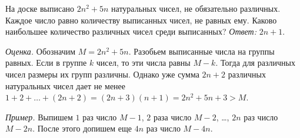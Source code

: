 \problem
На доске выписано $2 n^2 + 5 n$ натуральных чисел, не обязательно различных.
Каждое число равно количеству выписанных чисел, не равных ему.
Каково наибольшее количество различных чисел среди выписанных?
\solution
\emph{Ответ:} $2 n + 1$.
\par
\emph{Оценка.}
Обозначим $M = 2 n^2 + 5 n$.
Разобьем выписанные числа на группы равных.
Если в группе $k$ чисел, то эти числа равны $M - k$.
Тогда для различных чисел размеры их групп различны.
Однако уже сумма $2 n + 2$ различных натуральных чисел дает не менее
$1 + 2 + \ldots + (2 n + 2) = (2 n + 3) (n + 1) = 2 n^2 + 5 n + 3 > M$. 
\par
\emph{Пример.}
Выпишем
$1$ раз число $M - 1$,
$2$ раза число $M - 2$, \ldots,
$2 n$ раз число $M - 2 n$.
После этого допишем еще $4 n$ раз число $M - 4 n$.
\endproblem
